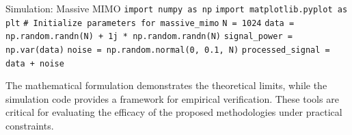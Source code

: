 \begin{pythonbox}{Simulation: Massive MIMO}
\texttt{import numpy as np}
\texttt{import matplotlib.pyplot as plt}
\texttt{}
\texttt{\# Initialize parameters for massive\_mimo}
\texttt{N = 1024}
\texttt{data = np.random.randn(N) + 1j * np.random.randn(N)}
\texttt{signal\_power = np.var(data)}
\texttt{noise = np.random.normal(0, 0.1, N)}
\texttt{processed\_signal = data + noise}
\end{pythonbox}

\vspace{0.5cm}
The mathematical formulation demonstrates the theoretical limits, while the simulation code provides a framework for empirical verification. These tools are critical for evaluating the efficacy of the proposed methodologies under practical constraints.

